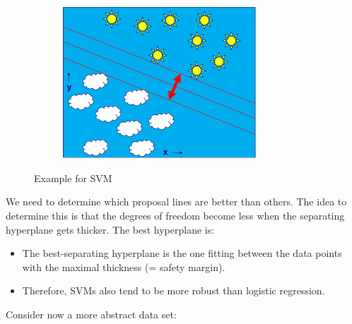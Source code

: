 \begin{note}
\begin{figure}[H]
\begin{subfigure}{0.3\textwidth}
  \end{subfigure}\hspace*{0.05\textwidth}
  \begin{subfigure}{0.3\textwidth}
    \centering
    \includegraphics[width=0.8\textwidth]{assets/svm/b__hyperplane_margin.png}
  \end{subfigure}
  \caption{Example for SVM}
  \label{fig:5_example_1}
\end{figure}

We need to determine which proposal lines are better than others. The idea to determine this is that the degrees of freedom become less when the separating hyperplane gets thicker. The best hyperplane is:
\begin{itemize}
  \item The best-separating hyperplane is the one fitting between the data points with the maximal thickness (= safety margin).
  \item Therefore, SVMs also tend to be more robust than logistic regression.
\end{itemize}

\end{note}

Consider now a more abstract data set:


